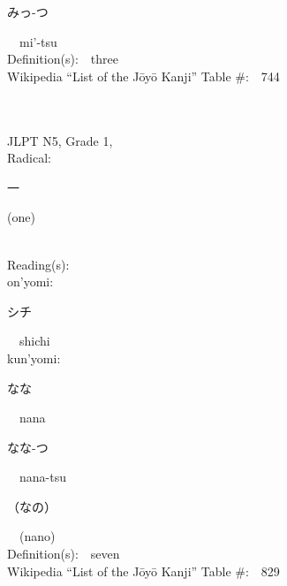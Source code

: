 \begin{multicols}{2}
{\hspace*{2em}}{\begin{CJK}{UTF8}{min} みっ-つ \end{CJK}}\ \ mi'-tsu\ \ \\
Definition(s):\ \ three \\
Wikipedia ``List of the J\=oy\=o Kanji'' Table \#:\ \ 744 \\
\ \ \\
{\fontsize{34pt}{40pt}  }\ \ \\  %
{JLPT N5, Grade 1, \\Radical:\ \ {\begin{CJK}{UTF8}{min} 一 \end{CJK}} (one) } \\
Reading(s):\ \ \\
{\hspace*{1em}}on'yomi:\ \ \\
{\hspace*{2em}}{\begin{CJK}{UTF8}{min} シチ \end{CJK}}\ \ shichi\ \ \\
{\hspace*{1em}}kun'yomi:\ \ \\
{\hspace*{2em}}{\begin{CJK}{UTF8}{min} なな \end{CJK}}\ \ nana\ \ \\
{\hspace*{2em}}{\begin{CJK}{UTF8}{min} なな-つ \end{CJK}}\ \ nana-tsu\ \ \\
{\hspace*{2em}}{\begin{CJK}{UTF8}{min} （なの） \end{CJK}}\ \ (nano)\ \ \\
Definition(s):\ \ seven \\
Wikipedia ``List of the J\=oy\=o Kanji'' Table \#:\ \ 829 \\
\ \ \\
{\fontsize{34pt}{40pt}  }\ \ \\  %

\end{multicols}
